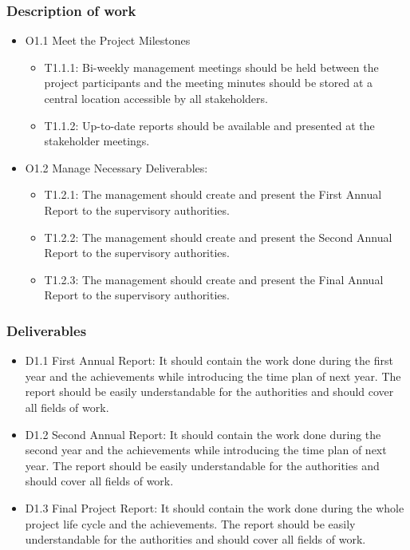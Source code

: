 \subsubsection{Description of work}
\begin{itemize}
	\item O1.1 Meet the Project Milestones
	\begin{itemize}
		\item T1.1.1: Bi-weekly management meetings should be held between the project participants and the meeting minutes should be stored at a central location accessible by all stakeholders.
		\item T1.1.2: Up-to-date reports should be available and presented at the stakeholder meetings. 
	\end{itemize}
	\item O1.2 Manage Necessary Deliverables:
	\begin{itemize}
		\item T1.2.1: The management should create and present the First Annual Report to the supervisory authorities.   
		\item T1.2.2: The management should create and present the Second Annual Report to the supervisory authorities.
		\item T1.2.3: The management should create and present the Final Annual Report to the supervisory authorities.
	\end{itemize} 
\end{itemize}

\subsubsection{Deliverables}

\begin{itemize}
	\item D1.1 First Annual Report: It should contain the work done during the first year and the achievements while introducing the time plan of next year. The report should be easily understandable for the authorities and should cover all fields of work.
	\item D1.2 Second Annual Report: It should contain the work done during the second year and the achievements while introducing the time plan of next year. The report should be easily understandable for the authorities and should cover all fields of work.  
	\item D1.3 Final Project Report:  It should contain the work done during the whole project life cycle and the achievements. The report should be easily understandable for the authorities and should cover all fields of work.  
\end{itemize}